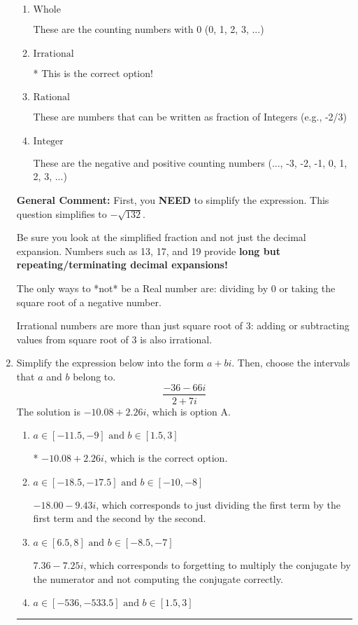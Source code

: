\documentclass{extbook}[14pt]
\newcommand{\litem}[1]{\item #1

\rule{\textwidth}{0.4pt}}
\begin{document}
\begin{enumerate}
{\begin{enumerate}[label=\Alph*.]
These are Nonreal Complex numbers \textbf{OR} things that are not numbers (e.g., dividing by 0).
\item \( \text{Whole} \)

These are the counting numbers with 0 (0, 1, 2, 3, ...)
\item \( \text{Irrational} \)

* This is the correct option!
\item \( \text{Rational} \)

These are numbers that can be written as fraction of Integers (e.g., -2/3)
\item \( \text{Integer} \)

These are the negative and positive counting numbers (..., -3, -2, -1, 0, 1, 2, 3, ...)
\end{enumerate}

\textbf{General Comment:} First, you \textbf{NEED} to simplify the expression. This question simplifies to $-\sqrt{132}$. 
 
 Be sure you look at the simplified fraction and not just the decimal expansion. Numbers such as 13, 17, and 19 provide \textbf{long but repeating/terminating decimal expansions!} 
 
 The only ways to *not* be a Real number are: dividing by 0 or taking the square root of a negative number. 
 
 Irrational numbers are more than just square root of 3: adding or subtracting values from square root of 3 is also irrational.
}
\litem{
Simplify the expression below into the form $a+bi$. Then, choose the intervals that $a$ and $b$ belong to.
\[ \frac{-36 - 66 i}{2 + 7 i} \]The solution is \( -10.08  + 2.26 i \), which is option A.\begin{enumerate}[label=\Alph*.]
\item \( a \in [-11.5, -9] \text{ and } b \in [1.5, 3] \)

* $-10.08  + 2.26 i$, which is the correct option.
\item \( a \in [-18.5, -17.5] \text{ and } b \in [-10, -8] \)

 $-18.00  - 9.43 i$, which corresponds to just dividing the first term by the first term and the second by the second.
\item \( a \in [6.5, 8] \text{ and } b \in [-8.5, -7] \)

 $7.36  - 7.25 i$, which corresponds to forgetting to multiply the conjugate by the numerator and not computing the conjugate correctly.
\item \( a \in [-536, -533.5] \text{ and } b \in [1.5, 3] \)


\end{enumerate}}
\end{enumerate}
\end{document}
